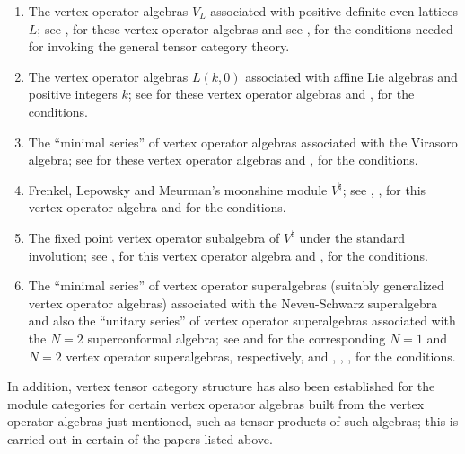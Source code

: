\documentclass[12pt]{article}
\begin{document}
\begin{enumerate}
\item The vertex operator algebras $V_L$ associated with positive
definite even lattices $L$; see \cite{B}, \cite{FLM2} for these vertex
operator algebras and see \cite{D1}, \cite{DL} for the conditions
needed for invoking the general tensor category theory.

\item The vertex operator algebras $L(k,0)$ associated with affine Lie
algebras and positive integers $k$; see \cite{FZ} for these vertex
operator algebras and \cite{FZ}, \cite{HLaffine} for the conditions.

\item The ``minimal series'' of vertex operator algebras associated
with the Virasoro algebra; see \cite{FZ} for these vertex operator
algebras and \cite{W}, \cite{H3} for the conditions.

\item Frenkel, Lepowsky and Meurman's moonshine module $V^{\natural}$;
see \cite{FLM1}, \cite{B}, \cite{FLM2} for this vertex operator
algebra and \cite{D2} for the conditions.

\item The fixed point vertex operator subalgebra of $V^{\natural}$
under the standard involution; see \cite{FLM1}, \cite{FLM2} for this
vertex operator algebra and \cite{D2}, \cite{H4} for the conditions.

\item The ``minimal series'' of vertex operator superalgebras
(suitably generalized vertex operator algebras) associated with the
Neveu-Schwarz superalgebra and also the ``unitary series'' of vertex
operator superalgebras associated with the $N=2$ superconformal
algebra; see \cite{KW} and \cite{A2} for the corresponding $N=1$ and
$N=2$ vertex operator superalgebras, respectively, and \cite{A1},
\cite{A3}, \cite{HM1}, \cite{HM2} for the conditions.
\end{enumerate}

In addition, vertex tensor category structure has also been
established for the module categories for certain vertex operator
algebras built {}from the vertex operator algebras just mentioned, such
as tensor products of such algebras; this is carried out in certain of
the papers listed above.
\end{document}
